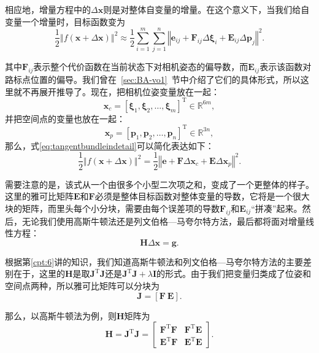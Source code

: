 相应地，增量方程中的$\Delta \bm{x}$则是对整体自变量的增量。在这个意义下，当我们给自变量一个增量时，目标函数变为
\begin{equation}
\label{eq:tangentbundleindetail}
\frac{1}{2}\left\Vert f(\bm{x} + \Delta \bm{x}) \right\Vert ^2 \approx \frac{1}{2}\sum_{i=1}^{m}\sum_{j=1}^n \left\Vert \bm{e}_{ij} + \bm{F}_{ij} \Delta \bm{\xi}_{i} + \bm{E}_{ij} \Delta \bm{p}_j \right\Vert^2 .
\end{equation}

其中$\bm{F}_{ij}$表示整个代价函数在当前状态下对相机姿态的偏导数，而$\bm{E}_{ij}$表示该函数对路标点位置的偏导。我们曾在~\ref{sec:BA-vo1}~节中介绍了它们的具体形式，所以这里就不再展开推导了。现在，把相机位姿变量放在一起：
\begin{equation}
\bm{x}_c=[ \bm{\xi}_1, \bm{\xi}_2, \ldots, \bm{\xi}_m ]^\mathrm{T} \in \mathbb{R}^{6m},
\end{equation}
并把空间点的变量也放在一起：
\begin{equation}
\bm{x}_p=[ \bm{p}_1, \bm{p}_2, \ldots , \bm{p}_n ]^\mathrm{T}\in \mathbb{R}^{3n},
\end{equation}
那么，式\eqref{eq:tangentbundleindetail}可以简化表达如下：
\begin{equation}
\label{eq:BAleastsquare}
\frac{1}{2}
\left\Vert 
f(\bm{x}+ \Delta \bm{x} )
\right\Vert ^2 = 
\frac{1}{2} 
\left\Vert 
\bm{e} + \bm{F}\Delta \bm{x}_c + \bm{E} \Delta \bm{x}_p 
\right \Vert ^2 .
\end{equation}

需要注意的是，该式从一个由很多个小型二次项之和，变成了一个更整体的样子。这里的雅可比矩阵$\bm{E}$和$\bm{F}$必须是整体目标函数对整体变量的导数，它将是一个很大块的矩阵，而里头每个小分块，需要由每个误差项的导数$\bm{F}_{ij}$和$\bm{E}_{ij}$“拼凑”起来。然后，无论我们使用高斯牛顿法还是列文伯格—马夸尔特方法，最后都将面对增量线性方程：
\begin{equation}
\bm{H} \Delta \bm{x} = \bm{g}.
\end{equation}

根据第\ref{cpt:6}讲的知识，我们知道高斯牛顿法和列文伯格—马夸尔特方法的主要差别在于，这里的$\bm{H}$是取$\bm{J}^\mathrm{T}\bm{J}$还是$\bm{J}^\mathrm{T}\bm{J}+ \lambda \bm{I}$的形式。由于我们把变量归类成了位姿和空间点两种，所以雅可比矩阵可以分块为
\begin{equation}
\bm{J}=[\bm{F} \ \bm{E}].
\end{equation}

那么，以高斯牛顿法为例，则$\bm{H}$矩阵为
\begin{equation}\label{eq:HessianMatrix}
\bm{H} = \bm{J}^\mathrm{T}\bm{J} =
\begin{bmatrix}
         \bm{F}^\mathrm{T}\bm{F}   &   \bm{F}^\mathrm{T}\bm{E}   \\ 
         \bm{E}^\mathrm{T}\bm{F}   &   \bm{E}^\mathrm{T}\bm{E}
\end{bmatrix} .
\end{equation}


